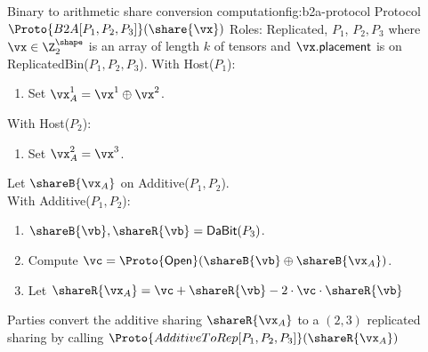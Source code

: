 \begin{Boxfig}{Binary to arithmetic share conversion computation}{fig:b2a-protocol}
  {Protocol $\Proto{B2A[P_1, P_2, P_3]}(\share{\vx})$}
  Roles: Replicated, $P_1$, $P_2, P_3$ where $\vx \in \Z_{2}^\shape$ is an array of length $k$
  of tensors and
  $\vx.\mathsf{placement}$ is on ReplicatedBin($P_1, P_2, P_3$). \newline
  With Host($P_1$):
  \begin{enumerate}
  \item Set $\vx_A^1 = \vx^1 \oplus \vx^2$.
  \end{enumerate}
  With Host($P_2$):
  \begin{enumerate}
      \item Set $\vx_A^2 = \vx^3$.
  \end{enumerate}
  Let $\shareB{\vx_A}$ on Additive($P_1, P_2$). \\
  With Additive($P_1, P_2$):
  \begin{enumerate}
      \item $\shareB{\vb}, \shareR{\vb} = \textsf{DaBit}(P_3)$.
      \item Compute $\vc = \Proto{\mathsf{Open}}( \shareB{\vb} \oplus \shareB{\vx_A})$.
      \item Let $\shareR{\vx_A} = \vc + \shareR{\vb} - 2 \cdot \vc \cdot \shareR{\vb}$
  \end{enumerate}
  Parties convert the additive sharing $\shareR{\vx_A}$ to a $(2,3)$ replicated sharing by calling
  $\Proto{AdditiveToRep[P_1,P_2,P_3]}(\shareR{\vx_A})$

\end{Boxfig}

